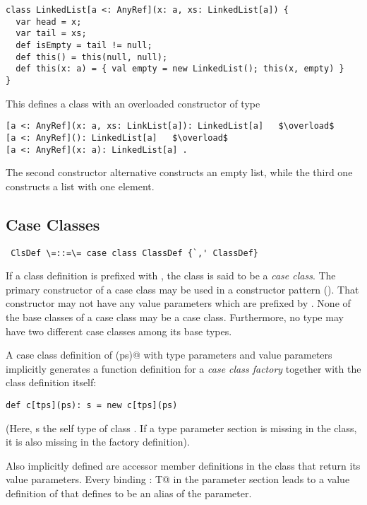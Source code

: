 \documentclass[11pt]{report}
\begin{document}
\begin{verbatim}
class LinkedList[a <: AnyRef](x: a, xs: LinkedList[a]) {
  var head = x;
  var tail = xs;
  def isEmpty = tail != null;  
  def this() = this(null, null);
  def this(x: a) = { val empty = new LinkedList(); this(x, empty) }
}
\end{verbatim}
This defines a class \verb@LinkedList@ with an overloaded constructor of type
\begin{verbatim}
[a <: AnyRef](x: a, xs: LinkList[a]): LinkedList[a]   $\overload$
[a <: AnyRef](): LinkedList[a]   $\overload$
[a <: AnyRef](x: a): LinkedList[a] .
\end{verbatim}
The second constructor alternative constructs an empty list, while the
third one constructs a list with one element.

\subsection{Case Classes}
\label{sec:case-classes}

\syntax\begin{verbatim} ClsDef \=::=\= case class ClassDef {`,' ClassDef}
\end{verbatim}

If a class definition is prefixed with \verb@case@, the class is said
to be a {\em case class}.  The primary constructor of a case class may
be used in a constructor pattern ().  That
constructor may not have any value parameters which are prefixed by
\verb@def@.  None of the base classes of a case class may be a case
class. Furthermore, no type may have two different case classes among
its base types.

A case class definition of \verb@c[tps](ps)@ with type
parameters \verb@tps@ and value parameters \verb@ps@ implicitly
generates a function definition for a {\em case class factory}
together with the class definition itself:
\begin{verbatim}
def c[tps](ps): s = new c[tps](ps)
\end{verbatim}
(Here, \verb@s@ s the self type of class \verb@c@. 
If a type parameter section
is missing in the class, it is also missing in the factory
definition).  

Also implicitly defined are accessor member definitions
in the class that return its value parameters. Every binding
\verb@x: T@ in the parameter section leads to a value definition of
\verb@x@ that defines \verb@x@ to be an alias of the parameter.  
\end{document}
